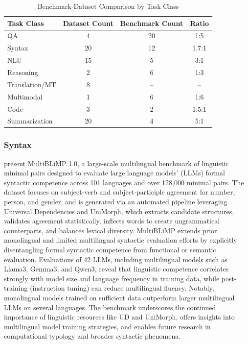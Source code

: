 \documentclass[acmsmall]{acmart}
\begin{document}
\begin{table}[htbp]
\centering
\caption{Benchmark-Dataset Comparison by Task Class}
\label{tab:benchmark-dataset-comparison}
\begin{tabular}{lccc}
\toprule
\textbf{Task Class} & \textbf{Dataset Count} & \textbf{Benchmark Count} & \textbf{Ratio} \\
\midrule
QA & 4 & 20 & 1:5 \\
Syntax & 20 & 12 & 1.7:1 \\
NLU & 15 & 5 & 3:1 \\
Reasoning & 2 & 6 & 1:3 \\
Translation/MT & 8 & -- & -- \\
Multimodal & 1 & 6 & 1:6 \\
Code & 3 & 2 & 1.5:1 \\
Summarization & 20 & 4 & 5:1 \\
\bottomrule
\end{tabular}
\end{table}

\subsubsection{Syntax}
\noindent

\citep{jumelet2025multiblimp10massivelymultilingual} present MultiBLiMP 1.0, a large-scale multilingual benchmark of linguistic minimal pairs designed to evaluate large language models’ (LLMs) formal syntactic competence across 101 languages and over 128,000 minimal pairs. The dataset focuses on subject-verb and subject-participle agreement for number, person, and gender, and is generated via an automated pipeline leveraging Universal Dependencies and UniMorph, which extracts candidate structures, validates agreement statistically, inflects words to create ungrammatical counterparts, and balances lexical diversity. MultiBLiMP extends prior monolingual and limited multilingual syntactic evaluation efforts by explicitly disentangling formal syntactic competence from functional or semantic evaluation. Evaluations of 42 LLMs, including multilingual models such as Llama3, Gemma3, and Qwen3, reveal that linguistic competence correlates strongly with model size and language frequency in training data, while post-training (instruction tuning) can reduce multilingual fluency. Notably, monolingual models trained on sufficient data outperform larger multilingual LLMs on several languages. The benchmark underscores the continued importance of linguistic resources like UD and UniMorph, offers insights into multilingual model training strategies, and enables future research in computational typology and broader syntactic phenomena.
\end{document}
